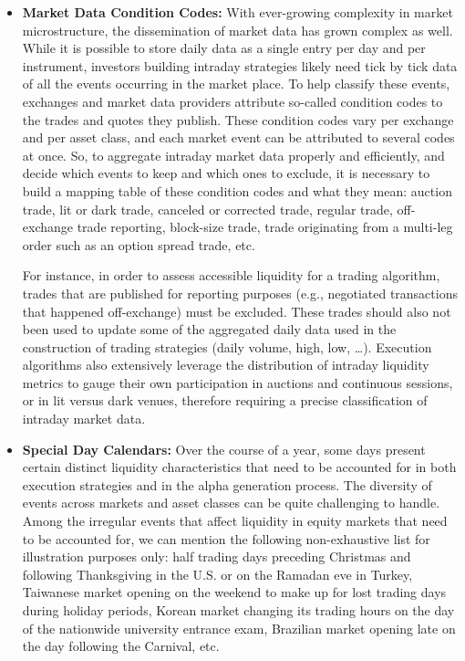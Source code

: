 \begin{itemize}
\pagebreak



\item \textbf{Market Data Condition Codes:} With ever-growing complexity in market microstructure, the dissemination of market data has grown complex as well. While it is possible to store daily data as a single entry per day and per instrument, investors building intraday strategies likely need tick by tick data of all the events occurring in the market place. To help classify these events, exchanges and market data providers attribute so-called condition codes to the trades and quotes they publish. These condition codes vary per exchange and per asset class, and each market event can be attributed to several codes at once. So, to aggregate intraday market data properly and efficiently, and decide which events to keep and which ones to exclude, it is necessary to build a mapping table of these condition codes and what they mean: auction trade, lit or dark trade, canceled or corrected trade, regular trade, off-exchange trade reporting, block-size trade, trade originating from a multi-leg order such as an option spread trade, etc.


For instance, in order to assess accessible liquidity for a trading algorithm, trades that are published for reporting purposes (e.g., negotiated transactions that happened off-exchange) must be excluded. These trades should also not been used to update some of the aggregated daily data used in the construction of trading strategies (daily volume, high, low, \dots). Execution algorithms also extensively leverage the distribution of intraday liquidity metrics to gauge their own participation in auctions and continuous sessions, or in lit versus dark venues, therefore requiring a precise classification of intraday market data. 


\item \textbf{Special Day Calendars:} Over the course of a year, some days present certain distinct liquidity characteristics that need to be accounted for in both execution strategies and in the alpha generation process. The diversity of events across markets and asset classes can be quite challenging to handle. Among the irregular events that affect liquidity in equity markets that need to be accounted for, we can mention the following non-exhaustive list for illustration purposes only: half trading days preceding Christmas and following Thanksgiving in the U.S. or on the Ramadan eve in Turkey, Taiwanese market opening on the weekend to make up for lost trading days during holiday periods, Korean market changing its trading hours on the day of the nationwide university entrance exam, Brazilian market opening late on the day following the Carnival, etc.



\end{itemize}
